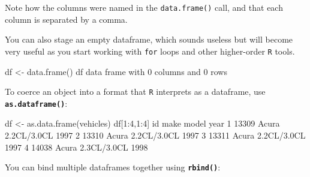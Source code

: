 \documentclass[
]{book}
\newenvironment{Shaded}{\begin{snugshade}}{\end{snugshade}}
\newcommand{\DecValTok}[1]{\textcolor[rgb]{0.00,0.00,0.81}{#1}}
\newcommand{\FloatTok}[1]{\textcolor[rgb]{0.00,0.00,0.81}{#1}}
\newcommand{\FunctionTok}[1]{\textcolor[rgb]{0.00,0.00,0.00}{#1}}
\newcommand{\NormalTok}[1]{#1}
\newcommand{\OtherTok}[1]{\textcolor[rgb]{0.56,0.35,0.01}{#1}}
\newcommand{\SpecialCharTok}[1]{\textcolor[rgb]{0.00,0.00,0.00}{#1}}
\begin{document}
Note how the columns were named in the \texttt{data.frame()} call, and that each column is separated by a comma.

You can also stage an empty dataframe, which sounds useless but will become very useful as you start working with \texttt{for} loops and other higher-order \texttt{R} tools.

\begin{Shaded}
\begin{Highlighting}[]
\NormalTok{df }\OtherTok{\textless{}{-}} \FunctionTok{data.frame}\NormalTok{()}
\NormalTok{df}
\NormalTok{data frame with }\DecValTok{0}\NormalTok{ columns and }\DecValTok{0}\NormalTok{ rows}
\end{Highlighting}
\end{Shaded}

To coerce an object into a format that \texttt{R} interprets as a dataframe, use \textbf{\texttt{as.dataframe()}}:

\begin{Shaded}
\begin{Highlighting}[]
\NormalTok{df }\OtherTok{\textless{}{-}} \FunctionTok{as.data.frame}\NormalTok{(vehicles)}
\NormalTok{df[}\DecValTok{1}\SpecialCharTok{:}\DecValTok{4}\NormalTok{,}\DecValTok{1}\SpecialCharTok{:}\DecValTok{4}\NormalTok{]}
\NormalTok{     id  make       model year}
\DecValTok{1} \DecValTok{13309}\NormalTok{ Acura }\FloatTok{2.2}\NormalTok{CL}\SpecialCharTok{/}\FloatTok{3.0}\NormalTok{CL }\DecValTok{1997}
\DecValTok{2} \DecValTok{13310}\NormalTok{ Acura }\FloatTok{2.2}\NormalTok{CL}\SpecialCharTok{/}\FloatTok{3.0}\NormalTok{CL }\DecValTok{1997}
\DecValTok{3} \DecValTok{13311}\NormalTok{ Acura }\FloatTok{2.2}\NormalTok{CL}\SpecialCharTok{/}\FloatTok{3.0}\NormalTok{CL }\DecValTok{1997}
\DecValTok{4} \DecValTok{14038}\NormalTok{ Acura }\FloatTok{2.3}\NormalTok{CL}\SpecialCharTok{/}\FloatTok{3.0}\NormalTok{CL }\DecValTok{1998}
\end{Highlighting}
\end{Shaded}

You can bind multiple dataframes together using \textbf{\texttt{rbind()}}:
\end{document}
